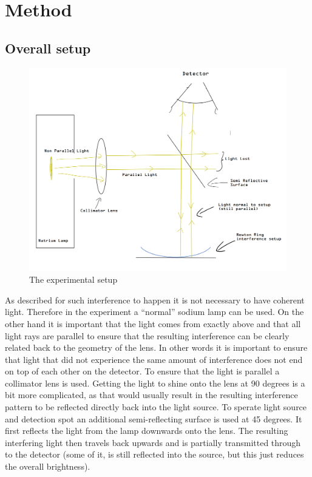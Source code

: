 \documentclass[12pt]{article}
\begin{document}
\section{Method}

\subsection{Overall setup}

\begin{figure}[H]
  \centering
  \includegraphics[width=17cm]{./images/setup.png}
  \caption{The experimental setup}
  \label{fig:setup}
\end{figure}

As described for such interference to happen it is not necessary to have coherent light.
Therefore in the experiment a “normal” sodium lamp can be used. On the other hand it is
important that the light comes from exactly above and that all light rays are parallel to
ensure that the resulting interference can be clearly related back to the geometry of the
lens. In other words it is important to ensure that light that did not experience the
same amount of interference does not end on top of each other on the detector. To
ensure that the light is parallel a collimator lens is used. Getting the light to shine 
onto the lens at 90 degrees is a bit more complicated, as that would usually result
in the resulting interference pattern to be reflected directly back into the light source.
To sperate light source and detection spot an additional semi-reflecting surface is
used at 45 degrees. It first reflects the light from the lamp downwards onto the lens. 
The resulting interfering light then travels back upwards and is partially transmitted 
through to the detector (some of it, is still reflected into the source, but this just reduces
the overall brightness).
\end{document}
